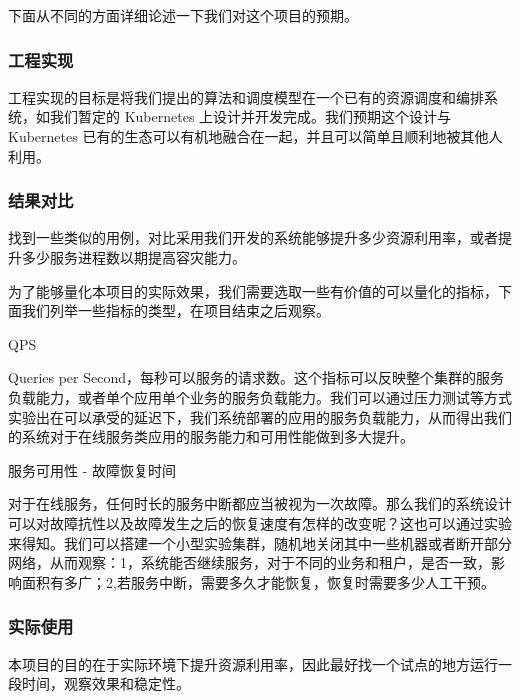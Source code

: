 下面从不同的方面详细论述一下我们对这个项目的预期。

\subsubsection{工程实现}

工程实现的目标是将我们提出的算法和调度模型在一个已有的资源调度和编排系统，如我们暂定的 Kubernetes 上设计并开发完成。我们预期这个设计与 Kubernetes 已有的生态可以有机地融合在一起，并且可以简单且顺利地被其他人利用。

\subsubsection{结果对比}

找到一些类似的用例，对比采用我们开发的系统能够提升多少资源利用率，或者提升多少服务进程数以期提高容灾能力。

为了能够量化本项目的实际效果，我们需要选取一些有价值的可以量化的指标，下面我们列举一些指标的类型，在项目结束之后观察。

QPS

Queries per Second，每秒可以服务的请求数。这个指标可以反映整个集群的服务负载能力，或者单个应用单个业务的服务负载能力。我们可以通过压力测试等方式实验出在可以承受的延迟下，我们系统部署的应用的服务负载能力，从而得出我们的系统对于在线服务类应用的服务能力和可用性能做到多大提升。

服务可用性 - 故障恢复时间

对于在线服务，任何时长的服务中断都应当被视为一次故障。那么我们的系统设计可以对故障抗性以及故障发生之后的恢复速度有怎样的改变呢？这也可以通过实验来得知。我们可以搭建一个小型实验集群，随机地关闭其中一些机器或者断开部分网络，从而观察：1，系统能否继续服务，对于不同的业务和租户，是否一致，影响面积有多广；2,若服务中断，需要多久才能恢复，恢复时需要多少人工干预。

\subsubsection{实际使用}

本项目的目的在于实际环境下提升资源利用率，因此最好找一个试点的地方运行一段时间，观察效果和稳定性。
